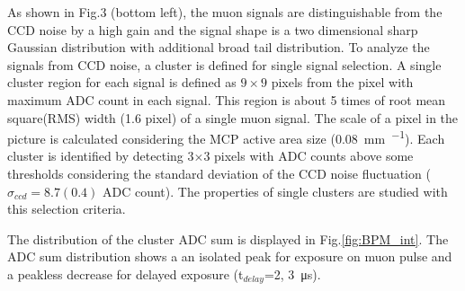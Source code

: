 \documentclass[preprint,3p,twocolumn]{elsarticle}
\begin{document}
As shown in Fig.3 (bottom left), the muon signals are distinguishable from the CCD noise by a high gain and the signal shape is a two dimensional sharp Gaussian distribution with additional broad tail distribution. 
To analyze the signals from CCD noise, a cluster is defined for single signal selection. A single cluster region for each signal is defined as $9\times9$ pixels from the pixel with maximum ADC count in each signal. This region is about 5 times of root mean square(RMS) width (1.6 pixel) of a single muon signal. The scale of a pixel in the picture is calculated considering the MCP active area size (\SI{0.08}{\mm \per \pixel}).
Each cluster is identified by detecting 3$\times$3 pixels with ADC counts above some thresholds considering the standard deviation of the CCD noise fluctuation ($\sigma_{ccd}=8.7(0.4)$ ADC count). The properties of single clusters are studied with this selection criteria.

The distribution of the cluster ADC sum is displayed in Fig.\ref{fig:BPM_int}.
The ADC sum distribution shows a an isolated peak for exposure on muon pulse and a peakless decrease for delayed exposure (t$_{delay}$={2}, \SI{3}{\micro\s}).
\end{document}
